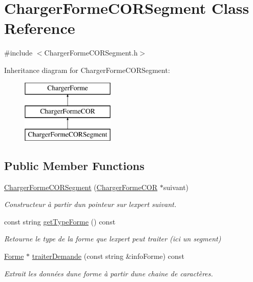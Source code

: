 \hypertarget{class_charger_forme_c_o_r_segment}{}\section{Charger\+Forme\+C\+O\+R\+Segment Class Reference}
\label{class_charger_forme_c_o_r_segment}


{\ttfamily \#include $<$Charger\+Forme\+C\+O\+R\+Segment.\+h$>$}

Inheritance diagram for Charger\+Forme\+C\+O\+R\+Segment\+:\begin{figure}[H]
\begin{center}
\leavevmode
\includegraphics[height=3.000000cm]{class_charger_forme_c_o_r_segment}
\end{center}
\end{figure}
\subsection*{Public Member Functions}
\begin{DoxyCompactItemize}
\item 
\hyperlink{class_charger_forme_c_o_r_segment_ac3a9caaf7fc8e03678cca2161513a1f4}{Charger\+Forme\+C\+O\+R\+Segment} (\hyperlink{class_charger_forme_c_o_r}{Charger\+Forme\+C\+OR} $\ast$suivant)
\begin{DoxyCompactList}\small\item\em Constructeur à partir d\textquotesingle{}un pointeur sur l\textquotesingle{}expert suivant. \end{DoxyCompactList}\item 
const string \hyperlink{class_charger_forme_c_o_r_segment_a88fc3dc3d1e4fb196246f5105965e285}{get\+Type\+Forme} () const
\begin{DoxyCompactList}\small\item\em Retourne le type de la forme que l\textquotesingle{}expert peut traiter (ici un segment) \end{DoxyCompactList}\item 
\hyperlink{class_forme}{Forme} $\ast$ \hyperlink{class_charger_forme_c_o_r_segment_ac7998f4a2669a3f88dc0b204af187780}{traiter\+Demande} (const string \&info\+Forme) const
\begin{DoxyCompactList}\small\item\em Extrait les données d\textquotesingle{}une forme à partir d\textquotesingle{}une chaine de caractères. \end{DoxyCompactList}\end{DoxyCompactItemize}
